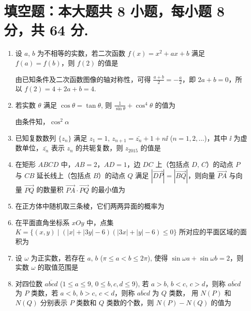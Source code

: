\documentclass{chsmc}
\begin{document}
\section{填空题：本大题共 8 小题，每小题 8 分，共 64 分.}

\begin{enumerate}
  \item 设 $a$, $b$ 为不相等的实数，若二次函数 $f(x) = x^2+ax+b$ 满足
    $f(a) = f(b)$，则 $f(2)$ 的值是 \blankline
    \begin{solution}
      由已知条件及二次函数图像的轴对称性，可得 $\frac{a+b}{2} = -\frac{a}{2}$，即 $2a+b = 0$，所以 $f(2) = 4+2a+b = 4$.
    \end{solution}
  \item 若实数 $\theta$ 满足 $\cos\theta = \tan\theta$,
    则 $\frac{1}{\sin\theta} + \cos^4\theta$ 的值为 \blankline
    \begin{solution}
      由条件知，$\cos^2\alpha$
    \end{solution}
  \item 已知复数数列 $\{z_n\}$ 满足 $z_1=1$, $z_{n+1} = \bar{z_n}+1+n\ii$ ($n=1,2,\ldots$)，其中 $\ii$ 为虚数单位，$\bar{z_n}$ 表示 $z_n$ 的共轭复数，则 $z_{2015}$ 的值是 \blankline
  \item 在矩形 $ABCD$ 中，$AB=2$，$AD=1$，边 $DC$ 上（包括点 $D$, $C$）的动点 $P$ 与 $CB$ 延长线上（包括点 $B$）的动点 $Q$ 满足 $|\overrightarrow{DP}| = |\overrightarrow{BQ}|$，则向量 $\overrightarrow{PA}$ 与向量 $\overrightarrow{PQ}$ 的数量积 $\overrightarrow{PA}\cdot\overrightarrow{PQ}$ 的最小值为 \blankline
  \item 在正方体中随机取三条棱，它们两两异面的概率为 \blankline
  \item 在平面直角坐标系 $xOy$ 中，点集 $K = \{(x,y) \mid (|x|+|3y|-6)(|3x|+|y|-6) \leq 0 \}$ 所对应的平面区域的面积为 \blankline
  \item 设 $\omega$ 为正实数，若存在 $a$, $b$ ($\pi\leq a<b\leq 2\pi$), 使得 $\sin\omega a+\sin\omega b = 2$，则实数 $\omega$ 的取值范围是 \blankline
    \answer{$\omega\in[\frac{9}{4},\frac{5}{2}]\cup [\frac{13}{4},+\infty)$}
  \item 对四位数 $\overline{abcd}$ ($1\leq a\leq 9$, $0\leq b,c,d\leq 9$), 若 $a>b$, $b<c$, $c>d$，则称 $\overline{abcd}$ 为 $P$ 类数，若 $a<b$, $b>c$, $c<d$，则称 $\overline{abcd}$ 为 $Q$ 类数，
  用 $N(P)$ 和 $N(Q)$ 分别表示 $P$ 类数和 $Q$ 类数的个数，则 $N(P)-N(Q)$ 的值为 \blankline
\end{enumerate}
\end{document}

